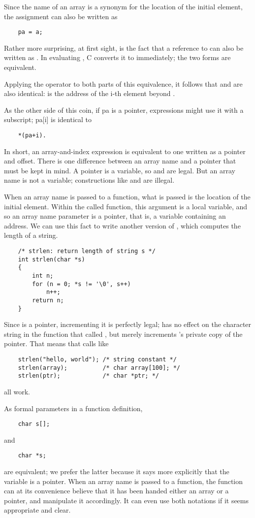 Since the name of an array is a synonym for the location of the initial element, the assignment  can also be written as
\begin{lstlisting}
    pa = a;
\end{lstlisting}
Rather more surprising, at first sight, is the fact that a reference to  can also be written as . In evaluating , C converts it to  immediately; the two forms are equivalent.

Applying the operator \code{\&} to both parts of this equivalence, it follows that  and  are also identical:  is the address of the i-th element beyond .

As the other side of this coin, if pa is a pointer, expressions might use it with a subscript; pa[i] is identical to
\begin{lstlisting}
    *(pa+i).
\end{lstlisting}
In short, an array-and-index expression is equivalent to one written as a pointer and offset.
There is one difference between an array name and a pointer that must be kept in mind.
A pointer is a variable, so  and  are legal. But an array name is not a variable; constructions like  and  are illegal.

When an array name is passed to a function, what is passed is the location of the initial element.
Within the called function, this argument is a local variable, and so an array name parameter is a pointer, that is, a variable containing an address.
We can use this fact to write another version of , which computes the length of a string.
\begin{lstlisting}
    /* strlen: return length of string s */
    int strlen(char *s)
    {
        int n;
        for (n = 0; *s != '\0', s++)
            n++;
        return n;
    }
\end{lstlisting}
Since  is a pointer, incrementing it is perfectly legal;  has no effect on the character string in the function that called , but merely increments 's private copy of the pointer.
That means that calls like
\begin{lstlisting}
    strlen("hello, world"); /* string constant */
    strlen(array);          /* char array[100]; */
    strlen(ptr);            /* char *ptr; */
\end{lstlisting}
all work.

As formal parameters in a function definition,
\begin{lstlisting}
    char s[];
\end{lstlisting}
and
\begin{lstlisting}
    char *s;
\end{lstlisting}
are equivalent; we prefer the latter because it says more explicitly that the variable is a pointer.
When an array name is passed to a function, the function can at its convenience believe that it has been handed either an array or a pointer, and manipulate it accordingly.
It can even use both notations if it seems appropriate and clear.

